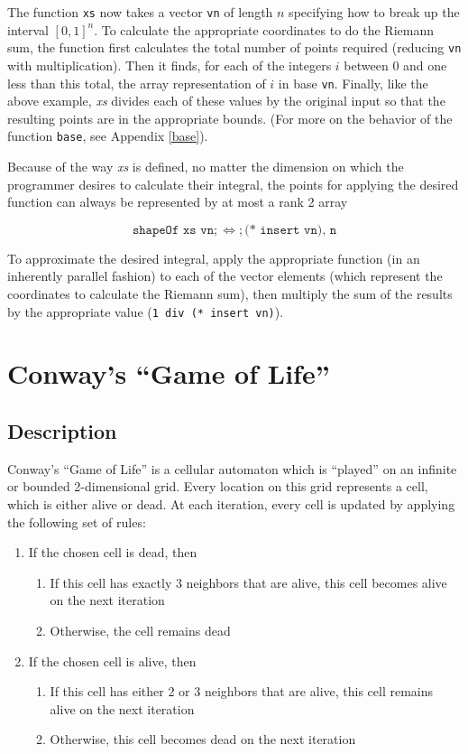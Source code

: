 The function \texttt{xs} now takes a vector \texttt{vn} of length $n$ 
specifying how to break up the interval $[0,1]^n$.
To calculate the appropriate coordinates to do the Riemann sum, 
the function first calculates the total number of points required (reducing \texttt{vn} with multiplication). 
Then it finds, for each of the integers $i$ between 0 and one less than this total, 
the array representation of $i$ in base \texttt{vn}. 
Finally, like the above example, \textit{xs} divides each of these values by the original input 
so that the resulting points are in the appropriate bounds.
(For more on the behavior of the function \texttt{base}, see Appendix \ref{base}). %

Because of the way \textit{xs} is defined, no matter the dimension on which the programmer desires to calculate their integral, 
the points for applying the desired function can always be represented by at most a rank 2 array 

\[\texttt{shapeOf xs vn} ; \Leftrightarrow ; \texttt{(* insert vn), n} \]

To approximate the desired integral, apply the appropriate function (in an inherently parallel fashion) 
to each of the vector elements (which represent the coordinates to calculate the Riemann sum), 
then multiply the sum of the results by the appropriate value (\texttt{1 div (* insert vn)}).

\section{Conway's ``Game of Life''}
\subsection{Description}
Conway's ``Game of Life''\cite{gol} is a cellular automaton which is ``played'' on an infinite or bounded 2-dimensional grid. 
Every location on this grid represents a cell, which is either alive or dead. 
At each iteration, every cell is updated by applying the following set of rules:

\begin{enumerate}
	\item If the chosen cell is dead, then
	\begin{enumerate}
		\item If this cell has exactly 3 neighbors that are alive, 
			this cell becomes alive on the next iteration
		\item Otherwise, the cell remains dead
	\end{enumerate}
	\item If the chosen cell is alive, then
	\begin{enumerate}
		\item If this cell has either 2 or 3 neighbors that are alive, 
			this cell remains alive on the next iteration
		\item Otherwise, this cell becomes dead on the next iteration
	\end{enumerate}
\end{enumerate}

